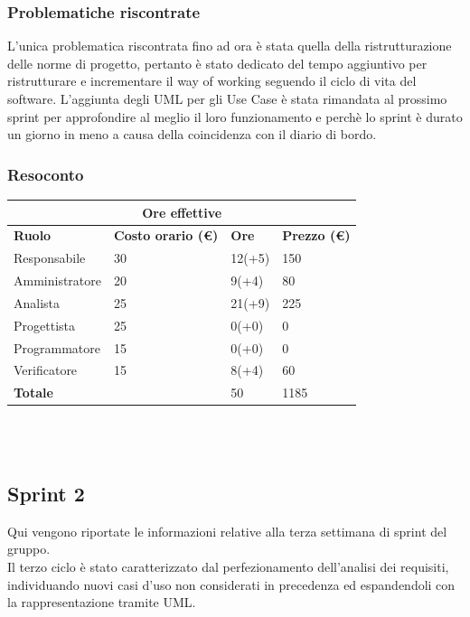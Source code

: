 \documentclass[9pt]{article}
\begin{document}
\subsubsection{Problematiche riscontrate}
L'unica problematica riscontrata fino ad ora è stata quella della ristrutturazione delle norme di progetto, pertanto è stato dedicato del tempo aggiuntivo per ristrutturare e incrementare il way of working seguendo il ciclo di vita del software.
L'aggiunta degli UML per gli Use Case è stata rimandata al prossimo sprint per approfondire al meglio il loro funzionamento e perchè lo sprint è durato un giorno in meno a causa della coincidenza con il diario di bordo.
\subsubsection{Resoconto}
\begin{center}
	\begin{tabularx}{\textwidth}{|X|X|X|X|}
		\hline
		\multicolumn{4}{|c|}{\textbf{Ore effettive}}                                      \\
		\hline
		\hline
		\textbf{Ruolo}  & \textbf{Costo orario (\euro)} & \textbf{Ore} & \textbf{Prezzo (\euro)} \\
		\hline
		Responsabile    & 30                            & 12(+5)       & 150                     \\
		\hline
		Amministratore  & 20                            & 9(+4)        & 80                      \\
		\hline
		Analista        & 25                            & 21(+9)       & 225                     \\
		\hline
		Progettista     & 25                            & 0(+0)        & 0                       \\
		\hline
		Programmatore   & 15                            & 0(+0)        & 0                       \\
		\hline
		Verificatore    & 15                            & 8(+4)        & 60                      \\
		\hline
		\hline
		\textbf{Totale} &                               & 50           & 1185                    \\
		\hline
	\end{tabularx}\\[8pt]
	\mbox{}\\
\end{center}


\subsection{Sprint 2}
Qui vengono riportate le informazioni relative alla terza settimana di sprint del gruppo. \\
Il terzo ciclo è stato caratterizzato dal perfezionamento dell'analisi dei requisiti, individuando nuovi casi d'uso non considerati in precedenza ed espandendoli con la rappresentazione tramite UML.\\
\end{document}
